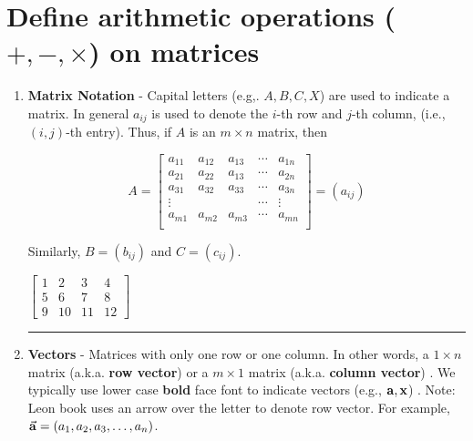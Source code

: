 %
\section*{Define arithmetic operations ($+, -, \times$) on matrices}
\begin{enumerate}
\item  \textbf{Matrix Notation} - Capital letters (e.g,. $A, B, C, X$) are used to indicate a matrix.  In general $a_{ij}$ is used to denote the $i$-th row and $j$-th column, (i.e.,  $(i,j)$-th entry).  Thus, if $A$ is an $m \times n$ matrix, then

\[ 
A =  \begin{bmatrix} 
	a_{11} & a_{12} & a_{13}	& \cdots & a_{1n} \\
 	a_{21} & a_{22} & a_{13}	& \cdots & a_{2n} \\
  	a_{31} & a_{32} & a_{33}	& \cdots & a_{3n} \\
	\vdots 	&	&	& \cdots & \vdots \\
    	a_{m1} & a_{m2} & a_{m3}	& \cdots & a_{mn} \\
    \end{bmatrix}  = (a_{ij})
 \]

Similarly, $B = (b_{ij})$ and $C=(c_{ij})$.

\begin{example}
$ \begin{bmatrix}  1& 2& 3 & 4\\ 5 & 6 & 7  & 8\\ 9 & 10 & 11 & 12 \end{bmatrix}$
\end{example}


\rule[0.01in]{\textwidth}{0.0025in}






\item \textbf{Vectors} - Matrices with only one row or one column.  In other words, a $1 \times n$ matrix  (a.k.a. \textbf{row vector})  or a $m \times 1$ matrix (a.k.a. \textbf{column vector}) .  We typically use lower case \textbf{bold} face font to indicate vectors (e.g., ${\bf a}, {\bf x}$) .  Note: Leon book uses an arrow over the letter to denote row vector.  For example, $\vec{{\bf a}} = (a_1, a_2, a_3, \dots, a_n)$.  





\end{enumerate}
